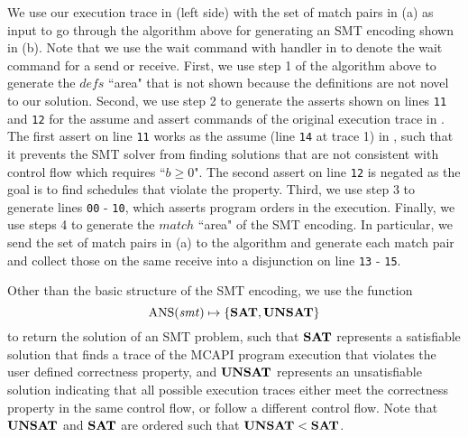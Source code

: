 We use our execution trace in  (left side) with the set of match pairs in (a) as input to go through the algorithm above for generating an SMT encoding shown in (b). Note that we use the wait command with handler in  to denote the wait command for a send or receive. First, we use step 1 of the algorithm above to generate the $\mathit{defs}$ ``area" that is not shown because the definitions are not novel to our solution. Second, we use step 2 to generate the asserts shown on lines \texttt{11} and \texttt{12} for the assume and assert commands of the original execution trace in . The first assert on line \texttt{11} works as the assume (line \texttt{14} at trace 1) in , such that it prevents the SMT solver from finding solutions that are not consistent with control flow which requires ``$b \ge 0$". The second assert on line \texttt{12} is negated as the goal is to find schedules that violate the property. Third, we use step 3 to generate lines \texttt{00} - \texttt{10}, which asserts program orders in the execution. Finally, we use steps 4 to generate the $\mathit{match}$ ``area" of the SMT encoding. In particular, we send the set of match pairs in (a) to the algorithm and generate each match pair and collect those on the same receive into a disjunction on line \texttt{13} - \texttt{15}.

Other than the basic structure of the SMT encoding, we use the function
\[\mathrm{ANS}(\mathit{smt}) \mapsto \{\mathrm{\textbf{SAT}},\mathrm{\textbf{UNSAT}}\} \]
to return the solution of an SMT problem, such that $\mathrm{\textbf{SAT}}$ represents a satisfiable solution that finds a trace of the MCAPI program execution that violates the user defined correctness property, and $\mathrm{\textbf{UNSAT}}$ represents an unsatisfiable solution indicating that all possible execution traces either meet the correctness property in the same control flow, or follow a different control flow. Note that $\mathrm{\textbf{UNSAT}}$ and $\mathrm{\textbf{SAT}}$ are ordered such that $\mathrm{\textbf{UNSAT}} < \mathrm{\textbf{SAT}}$.

